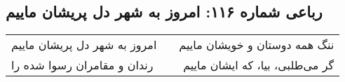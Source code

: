 \begin{center}
\section*{رباعی شماره ۱۱۶: امروز به شهر دل پریشان ماییم}
\label{sec:116}
\begin{longtable}{l p{0.5cm} r}
امروز به شهر دل پریشان ماییم
&&
ننگ همه دوستان و خویشان ماییم
\\
رندان و مقامران رسوا شده را
&&
گر می‌طلبی، بیا، که ایشان ماییم
\\
\end{longtable}
\end{center}
